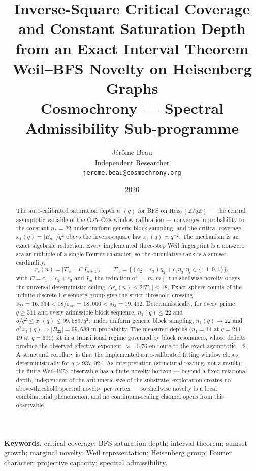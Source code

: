\documentclass[11pt,a4paper]{article}
\title{Inverse-Square Critical Coverage and Constant Saturation Depth\\
from an Exact Interval Theorem\\[0.4em]
\large Weil--BFS Novelty on Heisenberg Graphs\\[0.2em]
\large Cosmochrony --- Spectral Admissibility Sub-programme}
\author{J\'{e}r\^{o}me Beau\\[0.3em]
\small Independent Researcher\\
\small \texttt{jerome.beau@cosmochrony.org}}
\date{2026}
\theoremstyle{plain}
\theoremstyle{definition}
\newcommand{\Heis}{\mathrm{Heis}}
\newcommand{\epssat}{\varepsilon_{\mathrm{sat}}}
\newcommand{\xone}{x_1}
\newcommand{\none}{n_1}
\newcommand{\Tp}{T'_c}
\newcommand{\Fq}{\mathbb{Z}/q\mathbb{Z}}
\begin{document}
  \maketitle

  \begin{abstract}
    The auto-calibrated saturation depth $\none(q)$ for BFS on $\Heis_3(\Fq)$ --- the central
    asymptotic variable of the O25--O28 window
    calibration --- converges in probability to the constant $n_* = 22$ under uniform generic
    block sampling, and the critical coverage
    $\xone(q) = \lvert B_{\none}\rvert/q^2$ obeys the inverse-square law $\xone(q) \asymp q^{-2}$.
    The mechanism is an exact algebraic reduction.
    Every implemented three-step Weil fingerprint is a non-zero scalar multiple of a single Fourier
    character, so the cumulative rank is a sumset cardinality,
    \[
      r_c(n) = \bigl\lvert \Tp + C\,I_{n+1} \bigr\rvert,
      \qquad
      \Tp = \{(c_2+c_3)\eta_2 + c_3\eta_3 : \eta_i \in \{-1,0,1\}\},
    \]
    with $C = c_1+c_2+c_3$ and $I_m$ the reduction of $[-m,m]$; the shellwise novelty obeys the
    universal deterministic ceiling $\Delta r_c(n) \le 2\lvert\Tp\rvert \le 18$.
    Exact sphere counts of the infinite discrete Heisenberg group give the strict threshold crossing
    $s_{22} = 16{,}934 < 18/\epssat = 18{,}000 < s_{23} = 19{,}412$.
    Deterministically, for every prime $q \ge 311$ and every admissible block sequence,
    $\none(q) \le 22$ and $5/q^2 \le \xone(q) \le 99{,}689/q^2$; under uniform generic block sampling,
    $\none(q) \to 22$ and $q^2\,\xone(q) \to \lvert B_{22}\rvert = 99{,}689$ in probability.
    The measured depths ($\none = 14$ at $q=211$, $19$ at $q=601$) sit in a transitional regime
    governed by block resonances, whose deficits produce the observed effective exponent
    $\approx -0.76$ en route to the exact asymptotic $-2$.
    A structural corollary is that the implemented auto-calibrated fitting window closes
    deterministically for $q > 937{,}024$.
    As interpretation (structural reading, not a result): the finite Weil--BFS observable has a
    finite novelty horizon --- beyond a fixed relational depth, independent of the arithmetic size
    of the substrate, exploration creates no above-threshold spectral novelty per vertex --- so
    shellwise novelty is a local combinatorial phenomenon, and no continuum-scaling channel opens
    from this observable.
  \end{abstract}

  \medskip
  \noindent\textbf{Keywords.}
  critical coverage; BFS saturation depth; interval theorem; sumset growth; marginal novelty; Weil
  representation; Heisenberg group; Fourier character; projective capacity; spectral admissibility.
\end{document}
